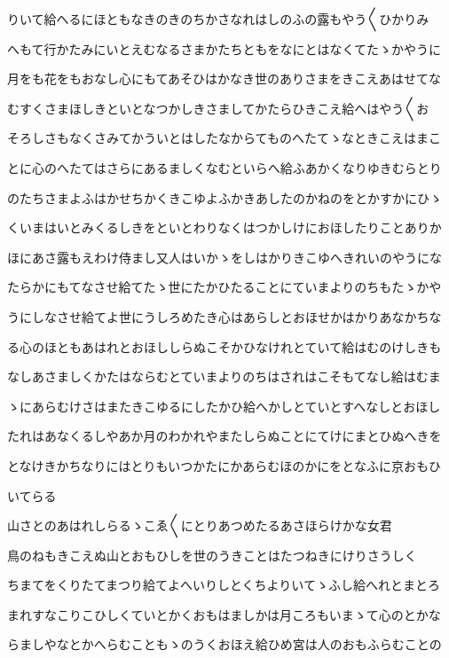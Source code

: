 \documentclass[a4paper,11pt,landscape]{ltjtarticle}
\begin{document}
\par\medskip
りいて給へるにほともなきのきのちかさなれはしのふの露もやう〱ひかりみ
\par\medskip
へもて行かたみにいとえむなるさまかたちともをなにとはなくてたゝかやうに
\par\medskip
月をも花をもおなし心にもてあそひはかなき世のありさまをきこえあはせてな
\par\medskip
むすくさまほしきといとなつかしきさましてかたらひきこえ給へはやう〱お
\par\medskip
そろしさもなくさみてかういとはしたなからてものへたてゝなときこえはまこ
\par\medskip
とに心のへたてはさらにあるましくなむといらへ給ふあかくなりゆきむらとり
\par\medskip
のたちさまよふはかせちかくきこゆよふかきあしたのかねのをとかすかにひゝ
\par\medskip
くいまはいとみくるしきをといとわりなくはつかしけにおほしたりことありか
\par\medskip
ほにあさ露もえわけ侍まし又人はいかゝをしはかりきこゆへきれいのやうにな
\par\medskip
たらかにもてなさせ給てたゝ世にたかひたることにていまよりのちもたゝかや
\par\medskip
うにしなさせ給てよ世にうしろめたき心はあらしとおほせかはかりあなかちな
\par\medskip
る心のほともあはれとおほししらぬこそかひなけれとていて給はむのけしきも
\par\medskip
なしあさましくかたはならむとていまよりのちはされはこそもてなし給はむま
\par\medskip
ゝにあらむけさはまたきこゆるにしたかひ給へかしとていとすへなしとおほし
\par\medskip
たれはあなくるしやあか月のわかれやまたしらぬことにてけにまとひぬへきを
\par\medskip
となけきかちなりにはとりもいつかたにかあらむほのかにをとなふに京おもひ
\par\medskip
いてらる
\par\medskip
山さとのあはれしらるゝこゑ〱にとりあつめたるあさほらけかな女君
\par\medskip
鳥のねもきこえぬ山とおもひしを世のうきことはたつねきにけりさうしく
\par\medskip
ちまてをくりたてまつり給てよへいりしとくちよりいてゝふし給へれとまとろ
\par\medskip
まれすなこりこひしくていとかくおもはましかは月ころもいまゝて心のとかな
\par\medskip
らましやなとかへらむこともゝのうくおほえ給ひめ宮は人のおもふらむことの
\end{document}
